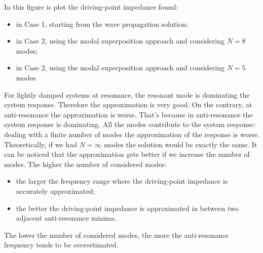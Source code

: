 \documentclass[a4paper,12pt,oneside]{article}
\begin{document}
In this figure is plot the driving-point impedance found:
\begin{itemize}
\item in Case 1, starting from the wave propagation solution;
\item in Case 2, using the modal superposition approach and considering $N=8$ modes;
\item in Case 2, using the modal superposition approach and considering $N=5$ modes.
\end{itemize}

For lightly damped systems at resonance, the resonant mode is dominating the
system response. Therefore the approximation is very good.
On the contrary, at anti-resonance the approximation is worse.
That's because in anti-resonance the system response is dominating. All the modes contribute to the system response: dealing with a finite number of modes the approximation of the response is worse. Theoretically, if we had $N= \infty$ modes the solution would be exactly the same. It can be noticed that the approximation gets better if we increase the number of modes.
The higher the number of considered modes:
\begin{itemize}
\item the larger the frequency range where the driving-point impedance is accurately approximated;
\item the better the driving-point impedance is approximated in between two adjacent anti-resonance minima.
\end{itemize}

The lower the number of considered modes, the more the anti-resonance frequency tends to be overestimated.
\end{document}
